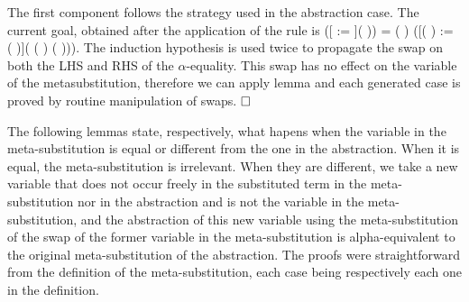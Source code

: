 \begin{coqdoccode}
\end{coqdoccode}
The first component follows the strategy used in the abstraction case. The current goal, obtained after the application of the rule  is    ([ := ](   )) =
    (   ) ([(   ) := (   )]( (   )  (   ))). The induction hypothesis is used twice to propagate the swap on both the LHS and RHS of the $\alpha$-equality. This swap has no effect on the variable of the metasubstitution, therefore we can apply lemma  and each generated case is proved by routine manipulation of swaps. $\hfill\Box$
\begin{coqdoccode}
\coqdocemptyline
\coqdocemptyline
\end{coqdoccode}
The following lemmas state, respectively, what hapens when the variable in the meta-substitution is equal or different from the one in the abstraction. When it is equal, the meta-substitution is irrelevant. When they are different, we take a new variable that does not occur freely in the substituted term in the meta-substitution nor in the abstraction and is not the variable in the meta-substitution, and the abstraction of this new variable using the meta-substitution of the swap of the former variable in the meta-substitution is alpha-equivalent to the original meta-substitution of the abstraction. The proofs were straightforward from the definition of the meta-substitution, each case being respectively each one in the definition. \newline
